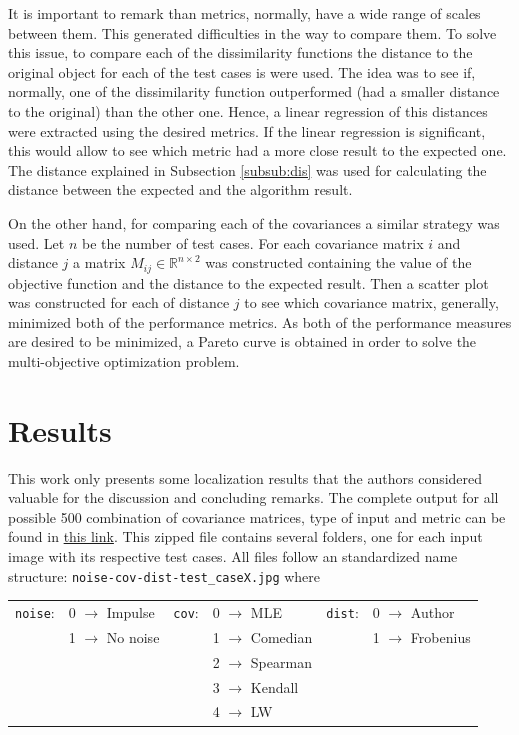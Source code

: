 \documentclass[11pt]{article}
\theoremstyle{definition}
\theoremstyle{remark}
\theoremstyle{remark}
\theoremstyle{remark}
\newcommand{\R}{{\mathbb{R}}}
\begin{document}
It is important to remark than metrics, normally, have a wide range of scales
between them. This generated difficulties in the way to compare them. To solve
this issue, to compare each of the dissimilarity functions the distance to the
original object for each of the test cases is were used. The idea was to see if,
normally, one of the dissimilarity function outperformed (had a smaller distance
to the original) than the other one. Hence, a linear regression of this
distances were extracted using the desired metrics. If the linear regression is
significant, this would allow to see which metric had a more close result to the
expected one. The distance explained in Subsection \ref{subsub:dis} was used for
calculating the distance between the expected and the algorithm result.

On the other hand, for comparing each of the covariances a similar strategy was
used. Let $n$ be the number of test cases. For each covariance matrix $i$ and
distance $j$ a matrix $M_{ij} \in \R^{n\times2}$ was constructed containing the
value of the objective function and the distance to the expected result. Then a
scatter plot was constructed for each of distance $j$ to see which covariance
matrix, generally, minimized both of the performance metrics. As both of the
performance measures are desired to be minimized, a Pareto curve is obtained in
order to solve the multi-objective optimization problem.

\section{Results}\label{sec:res}
This work only presents some localization results that the authors considered
valuable for the discussion and concluding remarks. The complete output for all
possible 500 combination of covariance matrices, type of input and metric can be
found in \href{https://bit.ly/2VMkvne}{this link}. This zipped file contains
several folders, one for each input image with its respective test cases. All
files follow an standardized name structure:
\texttt{noise-cov-dist-test\_caseX.jpg} where

\begin{table}[H]
  \centering
  \begin{tabular}{llllll}
    \texttt{noise}: & 0 $\rightarrow$ Impulse  & \texttt{cov}: & 0 $\rightarrow$ MLE      & \texttt{dist}: & 0 $\rightarrow$ Author    \\
                    & 1 $\rightarrow$ No noise &               & 1 $\rightarrow$ Comedian &                & 1 $\rightarrow$ Frobenius \\
                    &                          &               & 2 $\rightarrow$ Spearman &                &                           \\
                    &                          &               & 3 $\rightarrow$ Kendall  &                &                           \\
                    &                          &               & 4 $\rightarrow$ LW       &                &
  \end{tabular}
\end{table}
\end{document}
